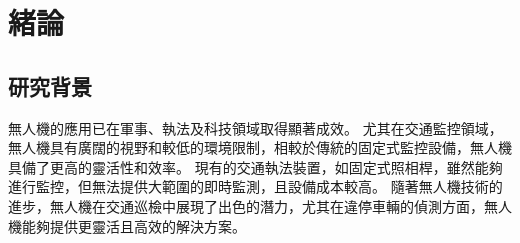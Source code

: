 \documentclass[12pt]{article}       %
\begin{document}
\newpage  %


\begin{center}
\tableofcontents  %
\thispagestyle{empty}  %
\end{center}
\newpage  %


\setcounter{page}{1}  %


\section{\centering 緒論}

\subsection{研究背景} 
\hspace{2em}無人機的應用已在軍事、執法及科技領域取得顯著成效。
尤其在交通監控領域，無人機具有廣闊的視野和較低的環境限制，相較於傳統的固定式監控設備，無人機具備了更高的靈活性和效率。
現有的交通執法裝置，如固定式照相桿，雖然能夠進行監控，但無法提供大範圍的即時監測，且設備成本較高。
隨著無人機技術的進步，無人機在交通巡檢中展現了出色的潛力，尤其在違停車輛的偵測方面，無人機能夠提供更靈活且高效的解決方案。
\end{document}
